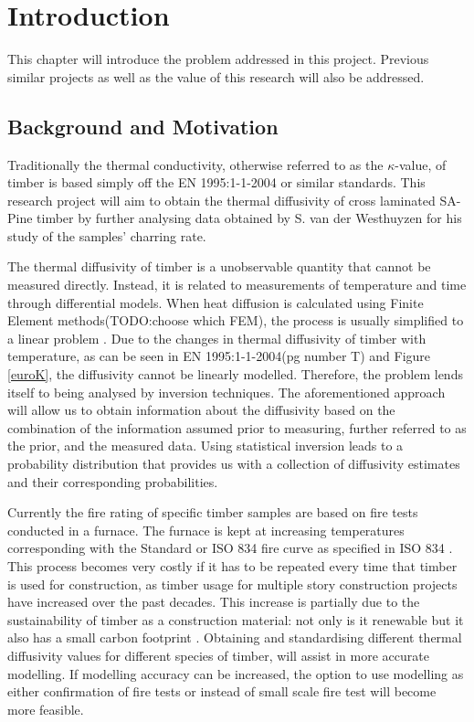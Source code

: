 \chapter{Introduction} \label{introduction}
This chapter will introduce the problem addressed in this project. 
Previous similar projects as well as the value of this research will also be addressed.

\section{Background and Motivation}

Traditionally the thermal conductivity, otherwise referred to as the $\kappa$-value, of timber is based simply off the EN 1995:1-1-2004 or similar standards.
This research project will aim to obtain the thermal diffusivity of cross laminated SA-Pine timber by further analysing data obtained by S. van der Westhuyzen for his study of the samples' charring rate.

The thermal diffusivity of timber is a unobservable quantity that cannot be measured directly. 
Instead, it is related to measurements of temperature and time through differential models. 
When heat diffusion is calculated using Finite Element methods(TODO:choose which FEM), the process is usually simplified to a linear problem \citep{Fish:2007}. 
Due to the changes in thermal diffusivity of timber with temperature, as can be seen in EN 1995:1-1-2004(pg number T) and Figure \ref{euroK}, the diffusivity cannot be linearly modelled. 
Therefore, the problem lends itself to being analysed by inversion techniques. 
The aforementioned approach will allow us to obtain information about the diffusivity based on the combination of the information assumed prior to measuring, further referred to as the prior, and the measured data. 
Using statistical inversion leads to a probability distribution that provides us with a collection of diffusivity estimates and their corresponding probabilities.

Currently the fire rating of specific timber samples are based on fire tests conducted in a furnace. 
The furnace is kept at increasing temperatures corresponding with the Standard or ISO 834 fire curve as specified in ISO 834 \citet{ISO:1999}.
This process becomes very costly if it has to be repeated every time that timber is used for construction, as timber usage for multiple story construction projects have increased over the past decades. 
This increase is partially due to the sustainability of timber as a construction material: not only is it renewable but it also has a small carbon footprint \citep{Salvadori:2017}.
Obtaining and standardising different thermal diffusivity values for different species of timber, will assist in more accurate modelling.
If modelling accuracy can be increased, the option to use modelling as either confirmation of fire tests or instead of small scale fire test will become more feasible.

